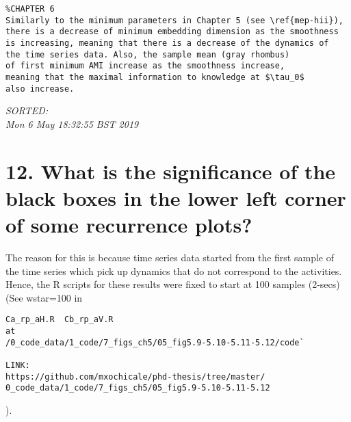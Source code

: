 \documentclass[12pt]{article}
\begin{document}
\begin{enumerate}
\begin{verbatim}
%CHAPTER 6
Similarly to the minimum parameters in Chapter 5 (see \ref{mep-hii}),
there is a decrease of minimum embedding dimension as the smoothness 
is increasing, meaning that there is a decrease of the dynamics of 
the time series data. Also, the sample mean (gray rhombus) 
of first minimum AMI increase as the smoothness increase,
meaning that the maximal information to knowledge at $\tau_0$ 
also increase.

	\end{verbatim}
	\textit{
	SORTED:  \\
	Mon  6 May 18:32:55 BST 2019
	}
	\\














\end{enumerate}




%
%
%
%


\section*{12. 
What is the significance of the black boxes 
in the lower left corner of some recurrence plots?
}

The reason for this is because 
time series data 
started from the first sample of the
time series which pick up dynamics that do not correspond to 
the activities. Hence, the R scripts for these results 
were fixed to start at 100 samples (2-secs)
(See wstar=100 in 
\begin{verbatim}
Ca_rp_aH.R  Cb_rp_aV.R
at
/0_code_data/1_code/7_figs_ch5/05_fig5.9-5.10-5.11-5.12/code`

LINK:
https://github.com/mxochicale/phd-thesis/tree/master/
0_code_data/1_code/7_figs_ch5/05_fig5.9-5.10-5.11-5.12
\end{verbatim}).
\end{document}
